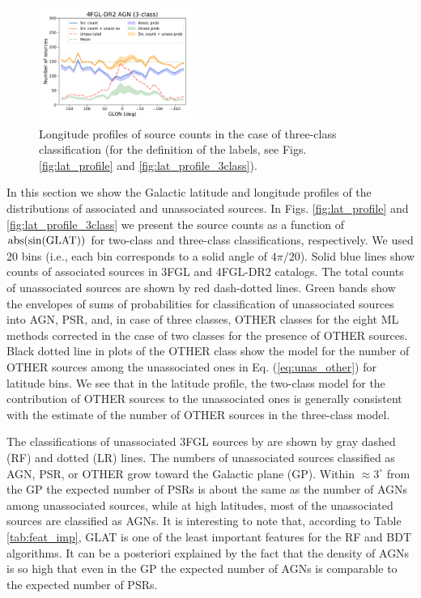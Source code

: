 \documentclass[referee]{aa} %
\begin{document}
\begin{figure}[h]
\includegraphics[width=0.45\textwidth]{plots/lon_profile_AGN_4FGL-DR2_3classes.pdf}
\caption{Longitude profiles of source counts in the case of three-class classification (for the definition of the labels, see Figs. \ref{fig:lat_profile} and \ref{fig:lat_profile_3class}).}  
\label{fig:lon_profile_3class}
\end{figure}


In this section we show the Galactic latitude and longitude profiles of the distributions of associated and unassociated sources.
In Figs. \ref{fig:lat_profile} and \ref{fig:lat_profile_3class} we present the source counts as a function of ${\rm abs(sin(GLAT))}$ 
for two-class and three-class classifications, respectively.
We used 20 bins (i.e., each bin corresponds to a solid angle of $4 \pi / 20$). 
Solid blue lines show counts of associated sources in 3FGL and 4FGL-DR2  catalogs.
The total counts of unassociated sources are shown by red dash-dotted lines.
Green bands show the envelopes of sums of probabilities for classification of unassociated sources into AGN, PSR, and, in case of three classes, OTHER classes for the eight ML methods corrected in the case of two classes for the presence of OTHER sources.
Black dotted line in plots of the OTHER class show the model for the number of OTHER sources among the unassociated ones
in Eq. (\ref{eq:unas_other}) for latitude bins.
We see that in the latitude profile, the two-class model for the contribution of OTHER sources to the unassociated ones is generally consistent with the estimate of the number of OTHER sources in the three-class model.

The classifications of unassociated 3FGL sources by \cite{2016ApJ...820....8S} are shown by gray dashed (RF) and dotted (LR) lines.
The numbers of unassociated sources classified as AGN, PSR, or OTHER grow toward the Galactic plane (GP).
Within $\approx 3^\circ$ from the GP the expected number of PSRs is about the same as the number of AGNs among unassociated sources, while at high latitudes, most of the unassociated sources are classified as AGNs.
It is interesting to note that, according to Table \ref{tab:feat_imp}, GLAT is one of the least important features for the RF and BDT algorithms.
It can be a posteriori explained by the fact that the density of AGNs is so high that even in the GP the expected number of AGNs is comparable to the expected number of PSRs.
\end{document}
